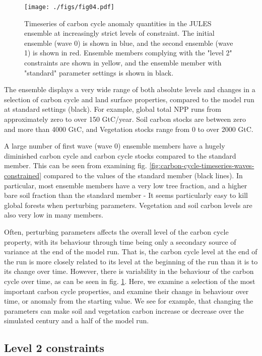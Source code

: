 \documentclass[gmd, manuscript]{copernicus}
\begin{document}
%
\begin{figure}[t]
\texttt{[image: ./figs/fig04.pdf]}
\caption{Timeseries of carbon cycle anomaly quantities in the JULES ensemble at increasingly strict levels of constraint. The initial ensemble (wave 0) is shown in blue, and the second ensemble (wave 1) is shown in red. Ensemble members complying with the "level 2" constraints are shown in yellow, and the ensemble member with "standard" parameter settings is shown in black.}
\label{fig:carbon-cycle-timeseries-anomaly-waves-constrained}
\end{figure}

The ensemble displays a very wide range of both absolute levels and changes in a selection of carbon cycle and land surface properties, compared to the model run at standard settings (black). For example, global total NPP runs from approximately zero to over 150 GtC/year. Soil carbon stocks are between zero and more than 4000 GtC, and Vegetation stocks range from 0 to over 2000 GtC.

A large number of first wave (wave 0) ensemble members have a hugely diminished carbon cycle and carbon cycle stocks compared to the standard member. This can be seen from examining fig. \ref{fig:carbon-cycle-timeseries-waves-constrained} compared to the values of the standard member (black lines). In particular, most ensemble members have a very low tree fraction, and a higher bare soil fraction than the standard member - It seems particularly easy to kill global forests when perturbing parameters. Vegetation and soil carbon levels are also very low in many members. 

Often, perturbing parameters affects the overall level of the carbon cycle property, with its behaviour through time being only a secondary source of variance at the end of the model run. That is, the carbon cycle level at the end of the run is more closely related to its level at the beginning of the run than it is to its change over time. However, there is variability in the behaviour of the carbon cycle over time, as can be seen in fig. \ref{fig:carbon-cycle-timeseries-anomaly-waves-constrained}. Here, we examine a selection of the most important carbon cycle properties, and examine their change in behaviour over time, or anomaly from the starting value. We see for example, that changing the parameters can make soil and vegetation carbon increase or decrease over the simulated century and a half of the model run. 

\subsection{Level 2 constraints}\label{ssec:level_2_constraints}
\end{document}
